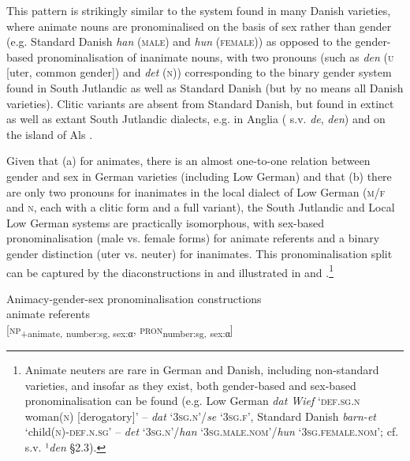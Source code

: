 \documentclass[output=paper]{langsci/langscibook}
\begin{document}
This pattern is strikingly similar to the system found in many Danish varieties, where animate nouns are pronominalised on the basis of sex rather than gender (e.g. Standard Danish \textit{han} (\textsc{male}) and \textit{hun} (\textsc{female})) as opposed to the gender-based pronominalisation of inanimate nouns, with two pronouns (such as \textit{den} (\textsc{u} {[}uter, common gender{]}) and \textit{det} (\textsc{n})) corresponding to the binary gender system found in South Jutlandic as well as Standard Danish (but by no means all Danish varieties). Clitic variants are absent from Standard Danish, but found in extinct as well as extant South Jutlandic dialects, e.g. in Anglia (\citealt{JulNielsen.1995} s.v. \textit{de}, \textit{den}) and on the island of Als \citep[24]{Jorgensen.1950}.

Given that (a) for animates, there is an almost one-to-one relation between gender and sex in German varieties (including Low German) and that (b) there are only two pronouns for inanimates in the local dialect of Low German (\textsc{m/f} and \textsc{n}, each with a clitic form and a full variant), the South Jutlandic and Local Low German systems are practically isomorphous, with sex-based pronominalisation (male vs. female forms) for animate referents and a binary gender distinction (uter vs. neuter) for inanimates. This pronominalisation split{} can be{} captured by the diaconstructions in  and illustrated in  and .\footnote{Animate neuters are rare in German and Danish, including non-standard varieties, and insofar as they exist, both gender-based and sex-based pronominalisation can be found (e.g. Low German \textit{dat Wief} ‘\textsc{def.sg.n} woman(\textsc{n}) {[}derogatory{]}’ – \textit{dat} ‘\textsc{3sg.n}’/\textit{se} ‘\textsc{3sg.f}’, Standard Danish \textit{barn-et} ‘child(\textsc{n})-\textsc{def.n.sg’} – \textit{det} ‘\textsc{3sg.n}’/\textit{han} ‘\textsc{3sg.male.nom}’/\textit{hun} ‘\textsc{3sg.female.nom}’; cf. \citealt{Rasmussen.1965} s.v. ¹\textit{den} §2.3).}


\ea
\label{ex:hoeder:12}
Animacy-gender-sex pronominalisation constructions\\

	\ea\label{ex:hoeder:12a}
	animate referents\\
       {[}\textsc{np}\textsubscript{+animate,} \textsubscript{number:sg}\textsubscript{, sex:}{\textsubscript{α}}, \textsc{pron}\textsubscript{number:sg,} {\textsubscript{sex:}\textsubscript{α}}{]}
       
\end{document}
